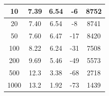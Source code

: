 \documentclass[../../tc_tp3_main.tex]{subfiles}
\begin{document}
\begin{table}[H]
\begin{tabular}{|c|c|c|c|c|}
10       & 7.39              & 6.54               & -6                    & 8752                \\ \hline
20       & 7.40              & 6.54               & -8                    & 8741                \\ \hline
50       & 7.60              & 6.47               & -17                   & 8420                \\ \hline
100      & 8.22              & 6.24               & -31                   & 7508                \\ \hline
200      & 9.69              & 5.46               & -49                   & 5573                \\ \hline
500      & 12.3              & 3.38               & -68                   & 2718                \\ \hline
1000     & 13.2              & 1.92               & -73                   & 1439                \\ \hline
\end{tabular}
\end{table}
\end{document}
